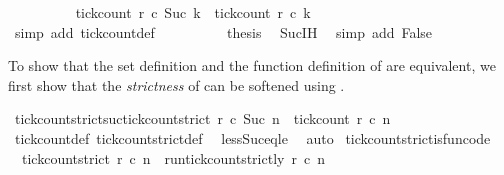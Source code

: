 \begin{isabellebody}
\ \ \ \ \ \ \ \ \isamarkupfalse%
\ {\isacartoucheopen}tick{\isacharunderscore}count\ r\ c\ {\isacharparenleft}Suc\ k{\isacharparenright}\ {\isacharequal}\ tick{\isacharunderscore}count\ r\ c\ k{\isacartoucheclose}\isanewline
\ \ \ \ \ \ \ \ \ \ \isamarkupfalse%
\ {\isacharparenleft}simp\ add{\isacharcolon}\ tick{\isacharunderscore}count{\isacharunderscore}def{\isacharparenright}\isanewline
\ \ \ \ \ \ \ \ \isamarkupfalse%
\ {\isacharquery}thesis\ \isamarkupfalse%
\ Suc{\isachardot}IH\ \isamarkupfalse%
\ {\isacharparenleft}simp\ add{\isacharcolon}\ False{\isacharparenright}\isanewline
\ \ \ \ \isamarkupfalse%
\isanewline
{}\isamarkupfalse%
%
\endisatagproof
{\isafoldproof}%
%
\isadelimproof
%
\endisadelimproof
%
\begin{isamarkuptext}%
To show that the set definition and the function definition 
  of  are equivalent, we first show that
  the \emph{strictness} of  can be softened using .%
\end{isamarkuptext}\isamarkuptrue%
\isamarkupfalse%
\ tick{\isacharunderscore}count{\isacharunderscore}strict{\isacharunderscore}suc{\isacharcolon}{\isacartoucheopen}tick{\isacharunderscore}count{\isacharunderscore}strict\ r\ c\ {\isacharparenleft}Suc\ n{\isacharparenright}\ {\isacharequal}\ tick{\isacharunderscore}count\ r\ c\ n{\isacartoucheclose}\isanewline
%
\isadelimproof
\ \ %
\endisadelimproof
%
\isatagproof
{}\isamarkupfalse%
\ tick{\isacharunderscore}count{\isacharunderscore}def\ tick{\isacharunderscore}count{\isacharunderscore}strict{\isacharunderscore}def\ \isamarkupfalse%
\ less{\isacharunderscore}Suc{\isacharunderscore}eq{\isacharunderscore}le\ \isamarkupfalse%
\ auto%
\endisatagproof
{\isafoldproof}%
%
\isadelimproof
\isanewline
%
\endisadelimproof
\isanewline
{}\isamarkupfalse%
\ tick{\isacharunderscore}count{\isacharunderscore}strict{\isacharunderscore}is{\isacharunderscore}fun{\isacharbrackleft}code{\isacharbrackright}{\isacharcolon}\isanewline
\ \ {\isacartoucheopen}tick{\isacharunderscore}count{\isacharunderscore}strict\ r\ c\ n\ {\isacharequal}\ run{\isacharunderscore}tick{\isacharunderscore}count{\isacharunderscore}strictly\ r\ c\ n{\isacartoucheclose}\isanewline
%
\isadelimproof
%
\endisadelimproof
%
\isatagproof
{}\isamarkupfalse%

\end{isabellebody}
